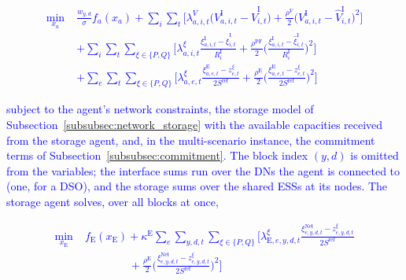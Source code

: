 \documentclass[preprint,12pt]{elsarticle}
\begin{document}
\textcolor{blue}{
    \begin{equation}
        \begin{aligned}
            \min_{x_a} \;
            & \frac{w_{y,d}}{\sigma} f_a(x_a)
            + \sum_{i} \sum_{t} \Big[
                \lambda^{V}_{a,i,t} \big(V^{\text{I}}_{a,i,t} - \hat{V}^{\text{I}}_{i,t}\big)
                + \frac{\rho^{V}}{2} \big(V^{\text{I}}_{a,i,t} - \hat{V}^{\text{I}}_{i,t}\big)^2
              \Big] \\
            & + \sum_{i} \sum_{t} \sum_{\xi \in \{P,Q\}} \Big[
                \lambda^{\xi}_{a,i,t} \frac{\xi^{\text{I}}_{a,i,t} - \hat{\xi}^{\text{I}}_{i,t}}{R^{\text{I}}_i}
                + \frac{\rho^{\text{PF}}}{2} \Big( \frac{\xi^{\text{I}}_{a,i,t} - \hat{\xi}^{\text{I}}_{i,t}}{R^{\text{I}}_i} \Big)^2
              \Big] \\
            & + \sum_{e} \sum_{t} \sum_{\xi \in \{P,Q\}} \Big[
                \lambda^{\xi}_{a,e,t} \frac{\xi^{\text{E}}_{a,e,t} - z^{\xi}_{e,t}}{2 S^{\text{ref}}}
                + \frac{\rho^{\text{E}}}{2} \Big( \frac{\xi^{\text{E}}_{a,e,t} - z^{\xi}_{e,t}}{2 S^{\text{ref}}} \Big)^2
              \Big]
        \end{aligned}
        \label{eq:admm_network_local}
    \end{equation}
}

\noindent
\textcolor{blue}{subject to the agent's network constraints, the storage model of
Subsection~\ref{subsubsec:network_storage} with the available capacities received from the storage agent, and, in the
multi-scenario instance, the commitment terms of Subsection~\ref{subsubsec:commitment}. The block index $(y,d)$ is
omitted from the variables; the interface sums run over the DNs the agent is connected to (one, for a DSO), and the
storage sums over the shared ESSs at its nodes. The storage agent solves, over all blocks at once,}

\textcolor{blue}{
    \begin{equation}
        \begin{aligned}
            \min_{x_{\text{E}}} \;
            & f_{\text{E}}(x_{\text{E}})
            + \kappa^{\text{E}} \sum_{e} \sum_{y,d,t} \sum_{\xi \in \{P,Q\}} \Big[
                \lambda^{\xi}_{\text{E},e,y,d,t} \frac{\xi^{\text{Net}}_{e,y,d,t} - z^{\xi}_{e,y,d,t}}{2 S^{\text{ref}}} \\
            & \qquad\qquad
                + \frac{\rho^{\text{E}}}{2} \Big( \frac{\xi^{\text{Net}}_{e,y,d,t} - z^{\xi}_{e,y,d,t}}{2 S^{\text{ref}}} \Big)^2
              \Big]
        \end{aligned}
        \label{eq:admm_esso_local}
    \end{equation}
}
\end{document}
